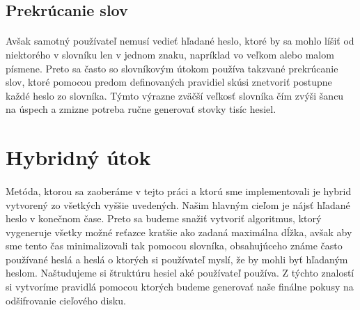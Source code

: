 \subsection{Prekrúcanie slov}
\paragraph{}
Avšak samotný používateľ nemusí vedieť hľadané heslo, ktoré by sa mohlo líšiť od niektorého v slovníku len v jednom znaku, napríklad vo veľkom alebo malom písmene. Preto sa často so slovníkovým útokom používa takzvané prekrúcanie slov, ktoré pomocou predom definovaných pravidiel skúsi znetvoriť postupne každé heslo zo slovníka. Týmto výrazne zväčší veľkosť slovníka čím zvýši šancu na úspech a zmizne potreba ručne generovať stovky tisíc hesiel. 

\section{Hybridný útok}
\paragraph{}
Metóda, ktorou sa zaoberáme v tejto práci a ktorú sme implementovali je hybrid vytvorený zo všetkých vyššie uvedených. Našim hlavným cieľom je nájsť hľadané heslo v konečnom čase. Preto sa budeme snažiť vytvoriť algoritmus, ktorý vygeneruje všetky možné reťazce kratšie ako zadaná maximálna dĺžka, avšak aby sme tento čas minimalizovali tak pomocou slovníka, obsahujúceho známe často používané heslá a heslá o ktorých si používateľ myslí, že by mohli byť hľadaným heslom. Naštudujeme si štruktúru hesiel aké používateľ používa. Z týchto znalostí si vytvoríme pravidlá pomocou ktorých budeme generovať naše finálne pokusy na odšifrovanie cieľového disku.